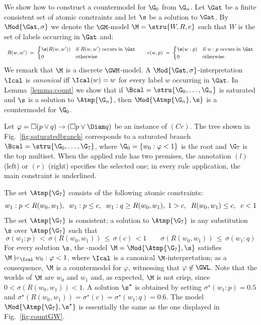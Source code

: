 \noindent
We show how to construct a countermodel for $\G_0$ from $\G_n$.  Let
$\Gat$ be a finite consistent set of atomic constraints and let $\s$
be a solution to $\Gat$.  By $\Mod{\Gat,\sigma}$ we denote the
$\GM$-model $\M=\stru{W,R,e}$ such that $W$ is the set of labels
occurring in $\Gat$ and:
\[\small
\begin{array}{l}
  R(w,w') \;=\;
  \begin{cases}
    \s(R(w,w')) & \mbox{if $R(w,w')$ occurs in $\Gat$}  
    \\
    0 & \mbox{otherwise}
  \end{cases}
  \qquad
  e(w,p) \;=\;
  \begin{cases}
    \s(w:p) & \mbox{if $w:p$ occurs in $\Gat$}  
    \\
    0 & \mbox{otherwise}
  \end{cases}
\end{array}
\]
We remark that $\M$ is a discrete $\GWM$-model.  A
$\Mod{\Gat,\sigma}$-interpretation $\Ical$ is \emph{canonical} iff
$\Ical(w)=w$ for every label $w$ occurring in $\Gat$. In
Lemma~\ref{lemma:count} we show that if $\Bcal=\stru{\G_0,\dots,\G_n}$
is saturated and $\s$ is a solution to $\Atmp{\G_n}$, then
$\Mod{\Atmp{\G_n},\s}$ is a countermodel for $\G_0$.


\begin{example}\label{ex:satBrancj}
  Let $\varphi=\Box(p\lor q) \to (\Box p\lor \Diam q)$ be an instance
  of $(Cr)$.  The tree shown in Fig.~\ref{fig:saturatedbranch}
  corresponds to a saturated branch $\Bcal=\stru{\G_0,\dots,\G_7}$,
  where $\G_0=\{w_0:\varphi < 1\}$ is the root and $\G_7$ is the top
  multiset.  When the applied rule has two premises, the annotation
  $(l)$ (left) or $(r)$ (right) specifies the selected one; in every
  rule application, the main constraint is underlined.

  The set $\Atmp{\G_7}$ consists of the following atomic constraints:
  \[\small
  w_1:p<R(w_0,w_1),\;\; w_1:p\leq c, \;\; w_1 : q \geq R(w_0,w_1),\;
  1> c,\;\; R(w_0,w_1)\leq c,\;\; c < 1
  \]
  The set $\Atmp{\G_7}$ is consistent; a solution to $\Atmp{\G_7}$ is
  any substitution $\s$ over $\Atmp{\G_7}$ such that
  \[
  \sigma(w_1:p)\, < \,\sigma\left(R(w_0,w_1)\right)\,\leq\, \sigma(c) \,< 1
  \qquad
  \sigma\left(R(w_0,w_1)\right)\,\leq \, \sigma(w_1: q) %
  \]
  For every solution $\s$, the \GWM-model $\M=\Mod{\Atmp{\G_7},\s}$
  satisfies $\M \models_\Ical w_0 :\varphi < 1$, where $\Ical$ is a
  canonical $\M$-interpretation; as a consequence, $\M$ is a countermodel for
  $\varphi$, witnessing that $\varphi\not\in\GWL$.
  Note that the worlds of $\M$ are $w_0$ and $w_1$ and,
  as expected, $\M$ is not crisp, since $0 < \sigma(R(w_0,w_1)) < 1$.
    A solution
  $\s^\star$ is obtained by setting $\sigma^\star(w_1:p) = 0.5$ and
  $\sigma^\star(R(w_0,w_1))= \sigma^\star(c) = \sigma^\star(w_1:q) =
  0.6$.  The model $\Mod{\Atmp{\G_7},\s^\star}$ is essentially the
  same as the one displayed in Fig.~\ref{fig:countGW}.
  \EndEx
\end{example}



